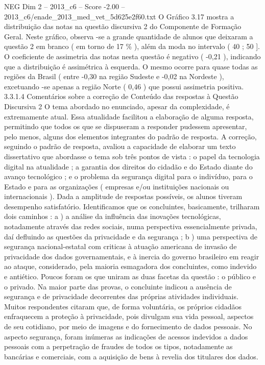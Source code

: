\begin{textsample}{NEG Dim 2 – 2013\_c6 – Score -2.00 – 2013\_c6/enade\_2013\_med\_vet\_5d625e2f60.txt}
O Gráfico 3.17 mostra a distribuição das notas na questão discursiva 2 do Componente de Formação Geral.
Neste gráfico, observa -se a grande quantidade de alunos que deixaram a questão 2 em branco ( em torno de 17 \% ), além da moda no intervalo ( 40 ; 50 ].
O coeficiente de assimetria das notas nesta questão é negativo ( -0,21 ), indicando que a distribuição é assimétrica à esquerda.
O mesmo ocorre para quase todas as regiões da Brasil ( entre -0,30 na região Sudeste e -0,02 na Nordeste ), excetuando -se apenas a região Norte ( 0,46 ) que possui assimetria positiva. 3.3.1.4 Comentários sobre a correção de Conteúdo das respostas à Questão Discursiva 2 O tema abordado no enunciado, apesar da complexidade, é extremamente atual.
Essa atualidade facilitou a elaboração de alguma resposta, permitindo que todos os que se dispuseram a responder pudessem apresentar, pelo menos, alguns dos elementos integrantes do padrão de resposta.
A correção, seguindo o padrão de resposta, avaliou a capacidade de elaborar um texto dissertativo que abordasse o tema sob três pontos de vista : o papel da tecnologia digital na atualidade ; a garantia dos direitos do cidadão e do Estado diante do avanço tecnológico ; e o problema da segurança digital para o indivíduo, para o Estado e para as organizações ( empresas e/ou instituições nacionais ou internacionais ).
Dada a amplitude de respostas possíveis, os alunos tiveram desempenho satisfatório.
Identificamos que os concluintes, basicamente, trilharam dois caminhos : a ) a análise da influência das inovações tecnológicas, notadamente através das redes sociais, numa perspectiva essencialmente privada, daí defluindo as questões da privacidade e da segurança ; b ) uma perspectiva de segurança nacional-estatal com criticas à atuação americana de invasão de privacidade dos dados governamentais, e à inercia do governo brasileiro em reagir ao ataque, considerado, pela maioria esmagadora dos concluintes, como indevido e antiético.
Poucos foram os que uniram as duas facetas da questão : o público e o privado.
Na maior parte das provas, o concluinte indicou a ausência de segurança e de privacidade decorrentes das próprias atividades individuais.
Muitos respondentes citaram que, de forma voluntária, os próprios cidadãos enfraquecem a proteção à privacidade, pois divulgam sua vida pessoal, aspectos de seu cotidiano, por meio de imagens e do fornecimento de dados pessoais.
No aspecto segurança, foram inúmeras as indicações de acessos indevidos a dados pessoais com a perpetração de fraudes de todos os tipos, notadamente as bancárias e comerciais, com a aquisição de bens à revelia dos titulares dos dados.

\end{textsample}
